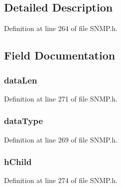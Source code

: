 \subsection{Detailed Description}


Definition at line 264 of file S\+N\+M\+P.\+h.



\subsection{Field Documentation}
\hypertarget{struct_o_i_d___i_n_f_o_ac4700c4e42e3f114d284e054f73bab3d}{}
\subsubsection[{data\+Len}]{ data\+Len}\label{struct_o_i_d___i_n_f_o_ac4700c4e42e3f114d284e054f73bab3d}


Definition at line 271 of file S\+N\+M\+P.\+h.

\hypertarget{struct_o_i_d___i_n_f_o_ae1b220d8614bfb5825696adc4c734b58}{}
\subsubsection[{data\+Type}]{ data\+Type}\label{struct_o_i_d___i_n_f_o_ae1b220d8614bfb5825696adc4c734b58}


Definition at line 269 of file S\+N\+M\+P.\+h.

\hypertarget{struct_o_i_d___i_n_f_o_a041fb72fa2d7415a4069d40644f6c0d9}{}
\subsubsection[{h\+Child}]{ h\+Child}\label{struct_o_i_d___i_n_f_o_a041fb72fa2d7415a4069d40644f6c0d9}


Definition at line 274 of file S\+N\+M\+P.\+h.

